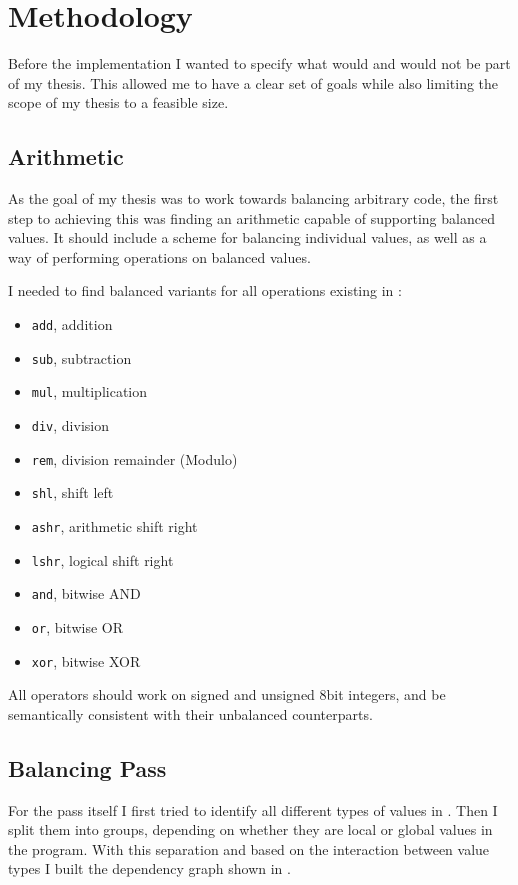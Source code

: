 \section{Methodology}
\label{methodology}
Before the implementation I wanted to specify what would and would not be part of my thesis.
This allowed me to have a clear set of goals while also limiting the scope of my thesis to a feasible size.

\subsection{Arithmetic}
As the goal of my thesis was to work towards balancing arbitrary code, the first step to achieving this was finding an arithmetic capable of supporting balanced values.
It should include a scheme for balancing individual values, as well as a way of performing operations on balanced values.

I needed to find balanced variants for all operations existing in \ir{}:
\begin{itemize}
\item \texttt{add}, addition
\item \texttt{sub}, subtraction
\item \texttt{mul}, multiplication
\item \texttt{div}, division
\item \texttt{rem}, division remainder (Modulo)
\item \texttt{shl}, shift left
\item \texttt{ashr}, arithmetic shift right
\item \texttt{lshr}, logical shift right
\item \texttt{and}, bitwise AND
\item \texttt{or}, bitwise OR
\item \texttt{xor}, bitwise XOR
\end{itemize}

All operators should work on signed and unsigned 8bit integers, and be semantically consistent with their unbalanced \ir{} counterparts.

\subsection{Balancing Pass}
For the pass itself I first tried to identify all different types of values in \ir{}.
Then I split them into groups, depending on whether they are local or global values in the program.
With this separation and based on the interaction between value types I built the dependency graph shown in .

